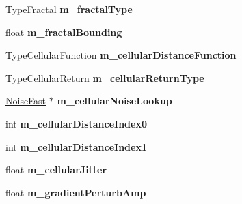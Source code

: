 \begin{DoxyCompactItemize}
Type\+Fractal {\bfseries m\+\_\+fractal\+Type}
\item 
\mbox{\label{class_flounder_1_1_noise_fast_ae2ce9184a0042521ced6041993d280e7}} 
float {\bfseries m\+\_\+fractal\+Bounding}
\item 
\mbox{\label{class_flounder_1_1_noise_fast_a88461b1cf7e795cec806ff054663577c}} 
Type\+Cellular\+Function {\bfseries m\+\_\+cellular\+Distance\+Function}
\item 
\mbox{\label{class_flounder_1_1_noise_fast_a13b50def17921169f4b1ef1d58ee62c0}} 
Type\+Cellular\+Return {\bfseries m\+\_\+cellular\+Return\+Type}
\item 
\mbox{\label{class_flounder_1_1_noise_fast_a1d460fcb54e5257e273dba796e8fa11c}} 
\hyperlink{class_flounder_1_1_noise_fast}{Noise\+Fast} $\ast$ {\bfseries m\+\_\+cellular\+Noise\+Lookup}
\item 
\mbox{\label{class_flounder_1_1_noise_fast_af2bc2cf9fdab9a1e6c2e03cfd7e50f61}} 
int {\bfseries m\+\_\+cellular\+Distance\+Index0}
\item 
\mbox{\label{class_flounder_1_1_noise_fast_ab551f7de8bf07dd050a55b558e3d3dce}} 
int {\bfseries m\+\_\+cellular\+Distance\+Index1}
\item 
\mbox{\label{class_flounder_1_1_noise_fast_a269ec7c073486f8aef96cf39e95f38c6}} 
float {\bfseries m\+\_\+cellular\+Jitter}
\item 
\mbox{\label{class_flounder_1_1_noise_fast_aa2bae2076c87197bc4aa44b1be5642e2}} 
float {\bfseries m\+\_\+gradient\+Perturb\+Amp}
\end{DoxyCompactItemize}
